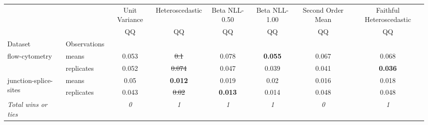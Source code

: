 \begin{tabular}{ll|c|c|c|c|c|c}
\toprule
{} & {} & {Unit Variance} & {Heteroscedastic} & {Beta NLL-0.50} & {Beta NLL-1.00} & {Second Order Mean} & {Faithful Heteroscedastic} \\
{} & {} & {QQ} & {QQ} & {QQ} & {QQ} & {QQ} & {QQ} \\
{Dataset} & {Observations} & {} & {} & {} & {} & {} & {} \\
\midrule
\multirow[c]{2}{*}{flow-cytometry} & means & 0.053 & \sout{0.1} & 0.078 & \textbf{0.055} & 0.067 & 0.068 \\
 & replicates & 0.052 & \sout{0.074} & 0.047 & 0.039 & 0.041 & \textbf{0.036} \\
\multirow[c]{2}{*}{junction-splice-sites} & means & 0.05 & \textbf{0.012} & 0.019 & 0.02 & 0.016 & 0.018 \\
 & replicates & 0.043 & \sout{0.02} & \textbf{0.013} & 0.014 & 0.048 & 0.048 \\
\textit{{Total wins or ties}} &  & \textit{0} & \textit{1} & \textit{1} & \textit{1} & \textit{0} & \textit{1} \\
\bottomrule
\end{tabular}
